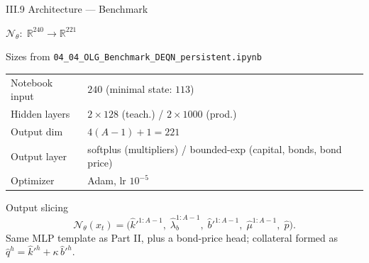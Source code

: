 \documentclass[aspectratio=169,11pt]{beamer}
\newcommand{\R}{\mathbb{R}}
\newcommand{\N}{\mathcal{N}}
\begin{document}
\begin{frame}{III.9 Architecture --- Benchmark}
\scriptsize
\begin{center}
$\N_\theta:\;\R^{240} \to \R^{221}$
\end{center}
\vspace{-4pt}

\begin{block}{Sizes from \texttt{04\_04\_OLG\_Benchmark\_DEQN\_persistent.ipynb}}
\centering
\begin{tabular}{ll}
\toprule
Notebook input   & $240$ (minimal state: $113$) \\
Hidden layers    & $2{\times}128$ (teach.) / $2{\times}1000$ (prod.) \\
Output dim       & $4(A{-}1) + 1 = 221$ \\
Output layer     & softplus (multipliers) / bounded-exp (capital, bonds, bond price) \\
Optimizer        & Adam, lr $10^{-5}$\\
\bottomrule
\end{tabular}
\end{block}

\vspace{-3pt}
\begin{exampleblock}{Output slicing}
\vspace{-6pt}
\[
\N_\theta(x_t)
=
\bigl(\hat k'^{1:A-1},\;\hat\lambda_b^{1:A-1},\;\hat b'^{1:A-1},\;\hat\mu^{1:A-1},\;\hat p\bigr).
\]
\vspace{-4pt}
Same MLP template as Part II, plus a bond-price head; collateral formed as $\hat q^h=\hat k'^h+\kappa\,\hat b'^h$.
\end{exampleblock}
\end{frame}
\end{document}
